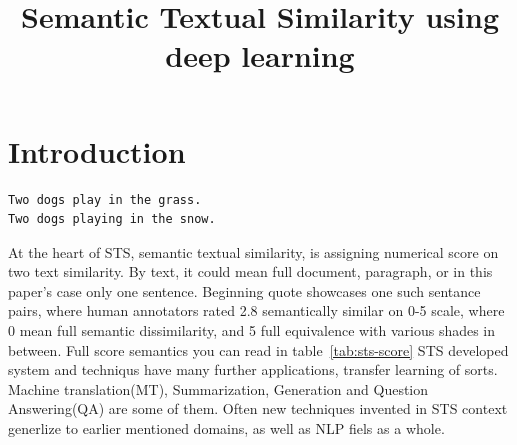 \documentclass[10pt, a4paper]{article}
\title{Semantic Textual Similarity using deep learning}
\begin{document}
\maketitleabstract

\section{Introduction}

\begin{verbatim}
Two dogs play in the grass.
Two dogs playing in the snow.
\end{verbatim}
At the heart of STS, semantic textual similarity, is assigning numerical score on two text similarity. By text, it could mean full document, paragraph, or in this paper's case only one sentence. Beginning quote showcases one such sentance pairs, where human annotators rated 2.8 semantically similar on 0-5 scale, where 0 mean full semantic dissimilarity, and 5 full equivalence with various shades in between. Full score semantics you can read in table~\ref{tab:sts-score}
STS developed system and techniqus have many further applications, transfer learning of sorts. Machine translation(MT), Summarization, Generation and Question Answering(QA) are some of them. Often new techniques invented in STS context generlize to earlier mentioned domains, as well as NLP fiels as a whole.
\end{document}
